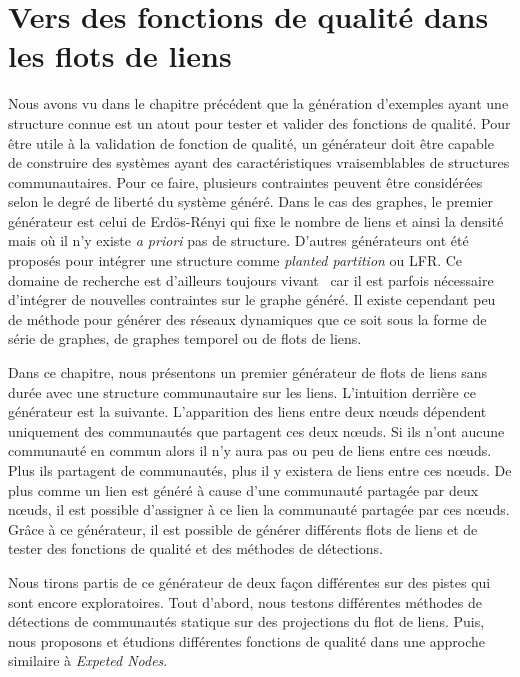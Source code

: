 \chapter{Vers des fonctions de qualité dans les flots de liens}
\minitoc
\label{versQualite}

Nous avons vu dans le chapitre précédent que la génération d'exemples ayant une structure connue est un atout pour tester et valider des fonctions de qualité.
Pour être utile à la validation de fonction de qualité, un générateur doit être capable de construire des systèmes ayant des caractéristiques vraisemblables de structures communautaires.
Pour ce faire, plusieurs contraintes peuvent être considérées selon le degré de liberté du système généré.
Dans le cas des graphes, le premier générateur est celui de Erdös-Rényi qui fixe le nombre de liens et ainsi la densité mais où il n'y existe \emph{a priori} pas de structure.
D'autres générateurs ont été proposés pour intégrer une structure comme \emph{planted partition} ou LFR.
Ce domaine de recherche est d'ailleurs toujours vivant~\cite{Tabourier2011,Obradovic2014} car il est parfois nécessaire d'intégrer de nouvelles contraintes sur le graphe généré.
Il existe cependant peu de méthode pour générer des réseaux dynamiques que ce soit sous la forme de série de graphes, de graphes temporel ou de flots de liens.


Dans ce chapitre, nous présentons un premier générateur de flots de liens sans durée avec une structure communautaire sur les liens.
L'intuition derrière ce générateur est la suivante.
L'apparition des liens entre deux n\oe uds dépendent uniquement des communautés que partagent ces deux n\oe uds.
Si ils n'ont aucune communauté en commun alors il n'y aura pas ou peu de liens entre ces n\oe uds.
Plus ils partagent de communautés, plus il y existera de liens entre ces n\oe uds.
De plus comme un lien est généré à cause d'une communauté partagée par deux n\oe uds, il est possible d'assigner à ce lien la communauté partagée par ces n\oe uds.
Grâce à ce générateur, il est possible de générer différents flots de liens et de tester des fonctions de qualité et des méthodes de détections.

Nous tirons partis de ce générateur de deux façon différentes sur des pistes qui sont encore exploratoires.
Tout d'abord, nous testons différentes méthodes de détections de communautés statique sur des projections du flot de liens.
Puis, nous proposons et étudions différentes fonctions de qualité dans une approche similaire à \emph{Expeted Nodes}.

